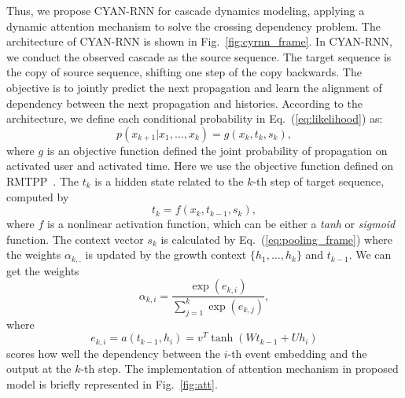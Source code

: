 Thus, we propose CYAN-RNN for cascade dynamics modeling, applying a dynamic
attention mechanism to solve the crossing dependency problem. The architecture
of CYAN-RNN is shown in Fig.~\ref{fig:cyrnn_frame}. In CYAN-RNN, we conduct the
observed cascade as the source sequence. The target sequence is the copy of
source sequence, shifting one step of the copy backwards. The objective is to
jointly predict the next propagation and learn the alignment of dependency
between the next propagation and histories. 
According to the architecture, we define each conditional probability in
Eq.~(\ref{eq:likelihood}) as:
\begin{equation}
\label{eq:cond_prob}
p(x_{k+1}|x_1,\ldots,x_k)=g(x_k, t_{k}, s_{k}),
\end{equation}
where $g$ is an objective function defined the joint probability of
propagation on activated user and activated time. Here we use the objective function
defined on RMTPP~\cite{DuKDD2016}.
The $t_k$ is a hidden state related
to the $k$-th step of target sequence, computed by
\begin{equation}
\label{eq:target_embedding}
t_k = f(x_k, t_{k-1}, s_k),
\end{equation}
where 
$f$ is
a nonlinear activation function, which can be either a \textit{tanh} or
\textit{sigmoid} function. The context vector $s_k$ is calculated by
Eq.~(\ref{eq:pooling_frame}) where the weights $\alpha_{k,.}$ 
is updated by the growth context
$\{h_1,\ldots,h_k\}$ and $t_{k-1}$. We can get the weights
\begin{equation}
\label{eq:alpha}
\alpha_{k,i}=\frac{\exp(e_{k,i})}{\sum_{j=1}^k \exp(e_{k,j})},
\end{equation}
where
\begin{equation}
\label{eq:score}
e_{k,i}=a(t_{k-1}, h_i)=v^T\tanh(W t_{k-1}+U h_i)
\end{equation}
scores how well the dependency between the $i$-th event
embedding and the output at the $k$-th step. The implementation of attention
mechanism in proposed model is briefly represented in Fig.~\ref{fig:att}. 

